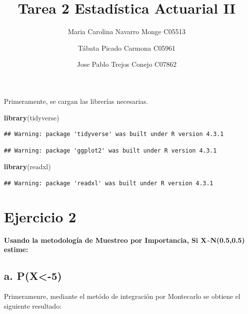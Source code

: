 \documentclass[
]{article}
\title{Tarea 2 Estadística Actuarial II}
\author{Maria Carolina Navarro Monge C05513 \and Tábata Picado Carmona
C05961 \and Jose Pablo Trejos Conejo C07862}
\date{}
\newenvironment{Shaded}{\begin{snugshade}}{\end{snugshade}}
\newcommand{\FunctionTok}[1]{\textcolor[rgb]{0.13,0.29,0.53}{\textbf{#1}}}
\newcommand{\NormalTok}[1]{#1}
\begin{document}
\maketitle

Primeramente, se cargan las librerías necesarias.

\begin{Shaded}
\begin{Highlighting}[]
\FunctionTok{library}\NormalTok{(tidyverse)}
\end{Highlighting}
\end{Shaded}

\begin{verbatim}
## Warning: package 'tidyverse' was built under R version 4.3.1
\end{verbatim}

\begin{verbatim}
## Warning: package 'ggplot2' was built under R version 4.3.1
\end{verbatim}

\begin{Shaded}
\begin{Highlighting}[]
\FunctionTok{library}\NormalTok{(readxl)}
\end{Highlighting}
\end{Shaded}

\begin{verbatim}
## Warning: package 'readxl' was built under R version 4.3.1
\end{verbatim}

\hypertarget{ejercicio-2}{%
\section{Ejercicio 2}\label{ejercicio-2}}

\textbf{Usando la metodología de Muestreo por Importancia, Si
X\textasciitilde N(0.5,0.5) estime:}

\hypertarget{a.-px-5}{%
\subsection{a. P(X\textless-5)}\label{a.-px-5}}

Primeramenre, mediante el metódo de integración por Montecarlo se
obtiene el siguiente resultado:
\end{document}
